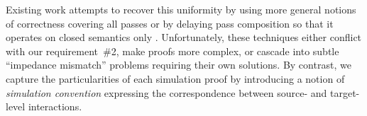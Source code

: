 Existing work attempts to recover this uniformity
by using more general notions of correctness
covering all passes
\cite{compcompcert,compcertm}
or by delaying pass composition so that
it operates on closed semantics only
\cite{sepcompcert,compcertm}.
Unfortunately, these techniques either
conflict with our requirement~\#2,
make proofs more complex,
or cascade into subtle ``impedance mismatch'' problems
requiring their own solutions.
%
By contrast,
we capture the particularities of each simulation proof
by introducing a notion of \emph{simulation convention}
expressing the correspondence between
source- and target-level interactions.


%
%
%
